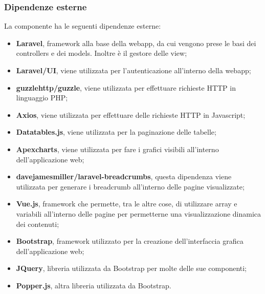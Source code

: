 	\subsubsection{Dipendenze esterne}
		La componente ha le seguenti dipendenze esterne:
		\begin{itemize}
			\item \textbf{Laravel}, framework alla base della webapp, da cui vengono prese le basi dei controllers e dei models. Inoltre è il gestore delle view;
			\item \textbf{Laravel/UI}, viene utilizzata per l'autenticazione all'interno della webapp;
			\item \textbf{guzzlehttp/guzzle}, viene utilizzata per effettuare richieste HTTP in linguaggio PHP;
			\item \textbf{Axios}, viene utilizzata per effettuare delle richieste HTTP in Javascript;
			\item \textbf{Datatables.js}, viene utilizzata per la paginazione delle tabelle;
			\item \textbf{Apexcharts}, viene utilizzata per fare i grafici visibili all'interno dell'applicazione web;
			\item \textbf{davejamesmiller/laravel-breadcrumbs}, questa dipendenza viene utilizzata per generare i breadcrumb all'interno delle pagine visualizzate;
			\item \textbf{Vue.js}, framework che permette, tra le altre cose, di utilizzare array e variabili all'interno delle pagine per permetterne una visualizzazione dinamica dei contenuti;
			\item \textbf{Bootstrap}, framework utilizzato per la creazione dell'interfaccia grafica dell'applicazione web;
			\item \textbf{JQuery}, libreria utilizzata da Bootstrap per molte delle sue componenti;
			\item \textbf{Popper.js}, altra libreria utilizzata da Bootstrap.
		\end{itemize}


